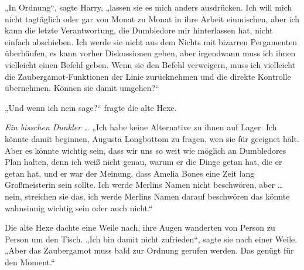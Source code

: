 „In Ordnung“, sagte Harry, „lassen sie es mich anders ausdrücken. Ich will mich nicht tagtäglich oder gar von Monat zu Monat in ihre Arbeit einmischen, aber ich kann die letzte Verantwortung, die Dumbledore mir hinterlassen hat, nicht einfach abschieben. Ich werde sie nicht aus dem Nichts mit bizarren Pergamenten überhäufen, es kann vorher Diskussionen geben, aber irgendwann muss ich ihnen vielleicht einen Befehl geben. Wenn sie den Befehl verweigern, muss ich vielleicht die Zaubergamot-Funktionen der Linie zurücknehmen und die direkte Kontrolle übernehmen. Können sie damit umgehen?“

„Und wenn ich nein sage?“ fragte die alte Hexe.

\emph{Ein bisschen Dunkler …}
„Ich habe keine Alternative zu ihnen auf Lager. Ich könnte damit beginnen, Augusta Longbottom zu fragen, wen sie für geeignet hält. Aber es könnte wichtig sein, dass wir uns so weit wie möglich an Dumbledores Plan halten, denn ich weiß nicht genau, warum er die Dinge getan hat, die er getan hat, und er war der Meinung, dass Amelia Bones eine Zeit lang Großmeisterin sein sollte. Ich werde Merlins Namen nicht beschwören, aber … nein, streichen sie das, ich werde Merlins Namen darauf beschwören das könnte wahnsinnig wichtig sein oder auch nicht.“

Die alte Hexe dachte eine Weile nach, ihre Augen wanderten von Person zu Person um den Tisch.
„Ich bin damit nicht zufrieden“, sagte sie nach einer Weile.
„Aber das Zaubergamot muss bald zur Ordnung gerufen werden. Das genügt für den Moment.“

